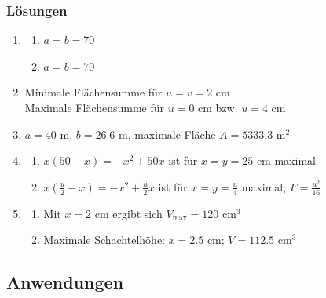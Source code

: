 \subsubsection*{Lösungen}
\begin{enumerate}
    \item \begin{enumerate}
              \item $a=b=70$
              \item $a=b=70$
          \end{enumerate}
    \item Minimale Flächensumme für $u=v=2$ cm\\
          Maximale Flächensumme für $u=0$ cm bzw. $u=4$ cm
    \item $a=40$ m, $b=26.6$ m, maximale Fläche $A=5333.\overline{3}$ m$^2$
    \item \begin{enumerate}
              \item $x(50-x)=-x^2+50x$ ist für $x=y=25$ cm maximal
              \item $x\left(\frac{u}{2}-x\right)=-x^2+\frac{u}{2}x$ ist für $x=y=\frac{u}{4}$ maximal; $F=\frac{u^2}{16}$
          \end{enumerate}
    \item \begin{enumerate}
              \item Mit $x=2$ cm ergibt sich $V_\text{max}=120$ cm$^3$
              \item Maximale Schachtelhöhe: $x=2.5$ cm; $V=112.5$ cm$^3$
          \end{enumerate}
\end{enumerate}
\newpage
\subsection{Anwendungen}
